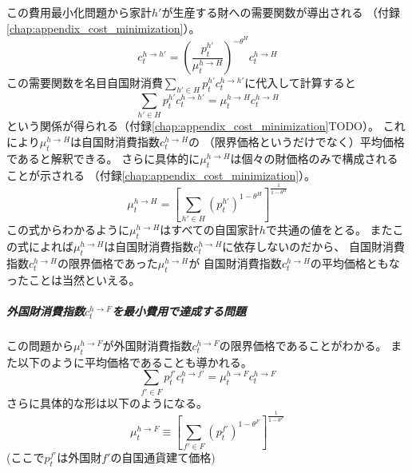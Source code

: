 この費用最小化問題から家計\(h'\)が生産する財への需要関数が導出される
（付録\eqref{chap:appendix_cost_minimization}）。
\begin{equation}
\label{form:model_households_indices_aggregation_stage1a_home_c_h_H_problem_c_h_h_eq}
    c_t^{h\to h'}=\left(\frac{p_t^{h'}}{\mu_t^{h\to H}}\right)^{-\theta^H}c_t^{h\to H}
\end{equation}
この需要関数を名目自国財消費\(\sum_{h'\in H}p_t^{h'}c_t^{h\to h'}\)に代入して計算すると
\begin{equation}
\label{form:model_households_indices_aggregation_stage1a_home_c_h_H_problem_mu_h_H_average_eq}
    \sum_{h'\in H}p_t^{h'}c_t^{h\to h'}=\mu_t^{h\to H}c_t^{h\to H}
\end{equation}
という関係が得られる（付録\ref{chap:appendix_cost_minimization}TODO）。
これにより\(\mu_t^{h\to H}\)は自国財消費指数\(c_t^{h\to H}\)の
（限界価格というだけでなく）平均価格であると解釈できる。
さらに具体的に\(\mu_t^{h\to H}\)は個々の財価格のみで構成されることが示される
（付録\ref{chap:appendix_cost_minimization}）。
\begin{equation}
\label{form:model_households_indices_aggregation_stage1a_home_c_h_H_problem_mu_h_H_eq}
    \mu_t^{h\to H}=\left[\sum_{h'\in H}(p_t^{h'})^{1-\theta^H}\right]^{\frac{1}{1-\theta^H}}
\end{equation}
この式からわかるように\(\mu_t^{h\to H}\)はすべての自国家計\(h\)で共通の値をとる。
またこの式によれば\(\mu_t^{h\to H}\)は自国財消費指数\(c_t^{h\to H}\)に依存しないのだから、
自国財消費指数\(c_t^{h\to H}\)の限界価格であった\(\mu_t^{h\to H}\)が
自国財消費指数\(c_t^{h\to H}\)の平均価格ともなったことは当然といえる。

\subparagraph{外国財消費指数\(c_t^{h\to F}\)を最小費用で達成する問題}
\label{sec:model_households_indices_aggregation_stage1a_home_c_h_F_problem}
この問題から\(\mu_t^{h\to F}\)が外国財消費指数\(c_t^{h\to F}\)の限界価格であることがわかる。
また以下のように平均価格であることも導かれる。
\begin{equation}
\label{eq:sec_model_households_aggregation_stage1a_home_mu_h_F_average}
    \sum_{f'\in F}p_t^{f'}c_t^{h\to f'}=\mu_t^{h\to F}c_t^{h\to F}
\end{equation}
さらに具体的な形は以下のようになる。
\begin{equation}
\label{form:model_households_indices_aggregation_stage1a_c_h_F_problem_mu_h_F_eq}
    \mu_t^{h\to F}\equiv\left[\sum_{f'\in F}(p_t^{f'})^{1-\theta^F}\right]^{\frac{1}{1-\theta^F}}
\end{equation}
(ここで\(p_t^{f'}\)は外国財\(f'\)の自国通貨建て価格)

